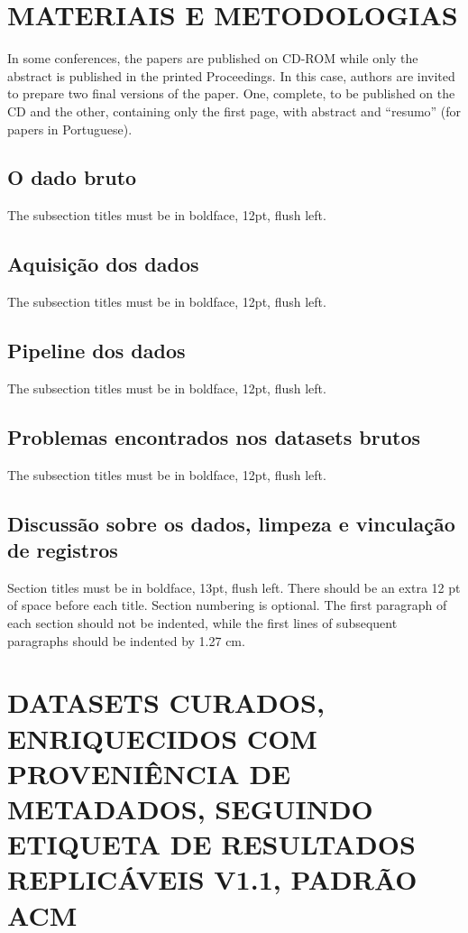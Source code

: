 \documentclass[12pt]{article}
\begin{document}
\section{MATERIAIS E METODOLOGIAS}

In some conferences, the papers are published on CD-ROM while only the
abstract is published in the printed Proceedings. In this case, authors are
invited to prepare two final versions of the paper. One, complete, to be
published on the CD and the other, containing only the first page, with
abstract and ``resumo'' (for papers in Portuguese).

\subsection{O dado bruto}

The subsection titles must be in boldface, 12pt, flush left.

\subsection{Aquisição dos dados}

The subsection titles must be in boldface, 12pt, flush left.

\subsection{Pipeline dos dados}

The subsection titles must be in boldface, 12pt, flush left.

\subsection{Problemas encontrados nos datasets brutos}

The subsection titles must be in boldface, 12pt, flush left.

\subsection{Discussão sobre os dados, limpeza e vinculação de registros}

Section titles must be in boldface, 13pt, flush left. There should be an extra
12 pt of space before each title. Section numbering is optional. The first
paragraph of each section should not be indented, while the first lines of
subsequent paragraphs should be indented by 1.27 cm.

\section{DATASETS CURADOS, ENRIQUECIDOS COM PROVENIÊNCIA DE METADADOS, SEGUINDO ETIQUETA DE RESULTADOS REPLICÁVEIS V1.1, PADRÃO ACM}\label{sec:datasetscurados}
\end{document}
